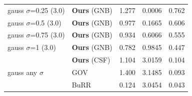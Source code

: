 \begin{tabular}{ll rrr}
\midrule

  \multirow{1}{*}{gauss $\sigma$=0.25 (3.0)} & \textbf{Ours} (GNB) & 1.277 & 0.0006 & 0.762 \\
   \multirow{1}{*}{gauss $\sigma$=0.5 (3.0)} & \textbf{Ours} (GNB) & 0.977 & 0.1665 & 0.606 \\
  \multirow{1}{*}{gauss $\sigma$=0.75 (3.0)} & \textbf{Ours} (GNB) & 0.934 & 0.6066 & 0.555 \\
     \multirow{1}{*}{gauss $\sigma$=1 (3.0)} & \textbf{Ours} (GNB) & 0.782 & 0.9845 & 0.447 \\


\midrule\multirow{3}{*}{gauss any $\sigma$}

   & \textbf{Ours} (CSF) & 1.104 & 3.0159 & 0.104 \\
   &                 GOV & 1.400 & 3.1485 & 0.093 \\
   &                BuRR & 0.124 & 3.0454 & 0.043 \\

		\bottomrule

	\end{tabular}

